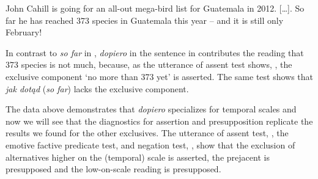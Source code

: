 \documentclass[output=paper,colorlinks,citecolor=brown]{langscibook}
\begin{document}
\ea\label{ex:tom:56}
John Cahill is going for an all-out mega-bird list for Guatemala in 2012. [\dots]. So far he has reached 373 species in Guatemala this year -- and it is still only February!
\z

\noindent In contrast to \textit{so far} in , \textit{dopiero} in the sentence in  contributes the reading that 373 species is not much, because, as the utterance of assent test shows, , the exclusive component ‘no more than 373 yet’  is asserted. The same test shows that \textit{jak dotąd} (\textit{so far}) lacks the exclusive component.

\ea\label{ex:tom:57}
\begin{xlist}
\end{xlist}
\z

\ea\label{ex:tom:58}
\begin{xlist}
\end{xlist}
\z

\largerpage
\noindent The data above demonstrates that \textit{dopiero} specializes for temporal scales and now we will see that the diagnostics for assertion and presupposition replicate the results we found for the other exclusives. The utterance of assent test, , the emotive factive predicate test,  and negation test, , show that the exclusion of alternatives higher on the (temporal) scale is asserted, the prejacent is presupposed and the low-on-scale reading is presupposed.
\end{document}
